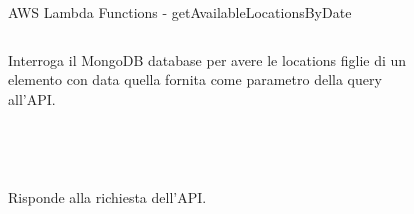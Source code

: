 \documentclass[xcolor=svgnames, aspectratio=169]{beamer}
\begin{document}

\begin{frame}{AWS Lambda Functions - getAvailableLocationsByDate}
    \begin{columns}[t]
        Interroga il MongoDB database per avere le locations figlie di un elemento con data quella fornita come parametro della query all'API.\\~\\~\\~\\~\\
        
        Risponde alla richiesta dell'API.
        
        \vspace*{-32pt}
        \begin{figure}[H]
            \centering
            \noindent{}
        \end{figure}
    \end{columns}
\end{frame}

\end{document}
